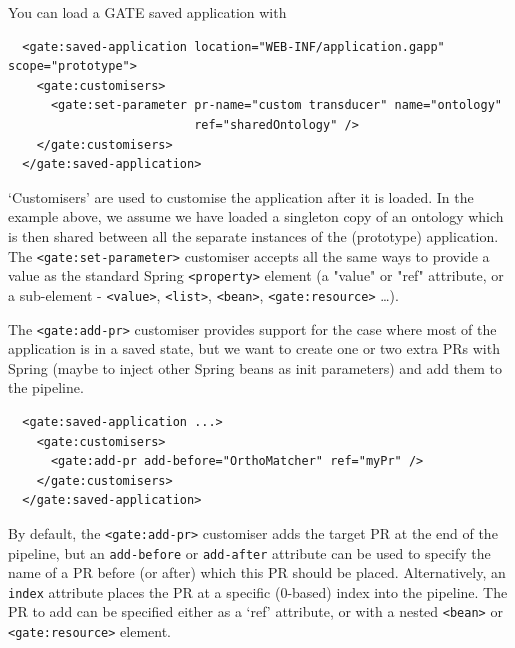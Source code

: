 You can load a GATE saved application with
\begin{small}
\begin{verbatim}
  <gate:saved-application location="WEB-INF/application.gapp" scope="prototype">
    <gate:customisers>
      <gate:set-parameter pr-name="custom transducer" name="ontology"
                          ref="sharedOntology" />
    </gate:customisers>
  </gate:saved-application>
\end{verbatim}\end{small}

`Customisers' are used to customise the application after it is loaded.  In the
example above, we assume we have loaded a singleton copy of an ontology which
is then shared between all the separate instances of the (prototype)
application.  The \verb|<gate:set-parameter>| customiser accepts all the same
ways to provide a value as the standard Spring \verb|<property>| element (a
"value" or "ref" attribute, or a sub-element - \verb|<value>|, \verb|<list>|,
\verb|<bean>|, \verb|<gate:resource>| \ldots).

The \verb|<gate:add-pr>| customiser provides support for the case where most of
the application is in a saved state, but we want to create one or two extra PRs
with Spring (maybe to inject other Spring beans as init parameters) and add
them to the pipeline.
\begin{small}\begin{verbatim}
  <gate:saved-application ...>
    <gate:customisers>
      <gate:add-pr add-before="OrthoMatcher" ref="myPr" />
    </gate:customisers>
  </gate:saved-application>
\end{verbatim}\end{small}
%
By default, the \verb|<gate:add-pr>| customiser adds the target PR at the end
of the pipeline, but an \texttt{add-before} or \texttt{add-after} attribute can
be used to specify the name of a PR before (or after) which this PR should be
placed.  Alternatively, an \texttt{index} attribute places the PR at a specific
(0-based) index into the pipeline.  The PR to add can be specified either as a
`ref' attribute, or with a nested \verb|<bean>| or \verb|<gate:resource>|
element.


